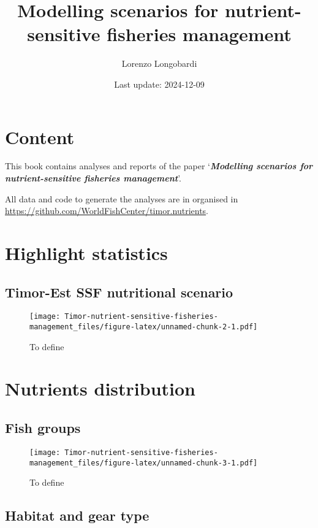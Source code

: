 \documentclass[
]{book}
\title{Modelling scenarios for nutrient-sensitive fisheries management}
\author{Lorenzo Longobardi}
\date{Last update: 2024-12-09}
\begin{document}
\maketitle

{
\setcounter{tocdepth}{1}
\tableofcontents
}
\chapter{Content}\label{content}

This book contains analyses and reports of the paper `\textbf{\emph{Modelling scenarios for nutrient-sensitive fisheries management}}'.

All data and code to generate the analyses are in organised in \url{https://github.com/WorldFishCenter/timor.nutrients}.

\chapter{Highlight statistics}\label{highlight}

\section{Timor-Est SSF nutritional scenario}\label{timor-est-ssf-nutritional-scenario}

\begin{figure}
\centering
\texttt{[image: Timor-nutrient-sensitive-fisheries-management\_files/figure-latex/unnamed-chunk-2-1.pdf]}
\caption{\label{fig:unnamed-chunk-2}To define}
\end{figure}

\chapter{Nutrients distribution}\label{distribution}

\section{Fish groups}\label{fish-groups}

\begin{figure}
\centering
\texttt{[image: Timor-nutrient-sensitive-fisheries-management\_files/figure-latex/unnamed-chunk-3-1.pdf]}
\caption{\label{fig:unnamed-chunk-3}To define}
\end{figure}

\section{Habitat and gear type}\label{habitat-and-gear-type}
\end{document}
